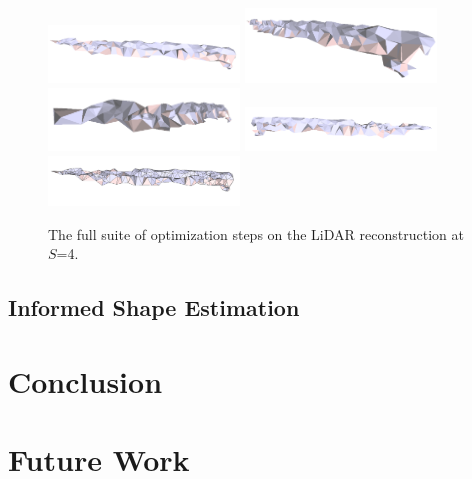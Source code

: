 \documentclass[12pt]{drexelthesis}
\let\Oldsection\section
\renewcommand{\section}{\FloatBarrier\Oldsection}
\begin{document}
\begin{figure}[!ht]
	\centering
		\includegraphics[width=2in]{real-lab-scans/meshed/optimized/scalespace4everything00.png}
		\includegraphics[width=2in]{real-lab-scans/meshed/optimized/scalespace4everything01.png}
		\includegraphics[width=2in]{real-lab-scans/meshed/optimized/scalespace4everything02.png}
		\includegraphics[width=2in]{real-lab-scans/meshed/optimized/scalespace4everything03.png}
		\includegraphics[width=2in]{real-lab-scans/meshed/optimized/scalespace4everything04.png}
		\caption[The full suite of optimization steps on the LiDAR reconstruction at $S$=4.]{\centering The full suite of optimization steps on the LiDAR reconstruction at $S$=4.}
	\label{lidar:scalespace4everything}
\end{figure}


\section{Informed Shape Estimation}


\chapter{Conclusion}
\label{chap:conclusion}


\chapter{Future Work}
\label{chap:future}
\end{document}
